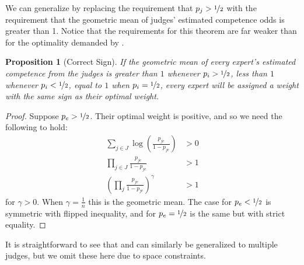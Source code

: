 \documentclass[letterpaper]{article} %
\newtheorem{proposition}{Proposition}
\newcommand{\judge}{\ensuremath{j} }
\newcommand{\judges}{\ensuremath{J} }
\newcommand{\expert}{\ensuremath{e} }
\newcommand{\ben}[1]{\textcolor{red}{Ben says: #1}}
\begin{document}
We can generalize  by replacing the requirement that $p_j > \nicefrac{1}{2}$ with the requirement that the geometric mean of judges' estimated competence odds is greater than 1. Notice that the requirements for this theorem are far weaker than for the optimality demanded by .


\begin{proposition}[Correct Sign]\label{theorem:rightsign}
If the geometric mean of every expert's estimated competence from the judges is greater than $1$ whenever $p_i > \nicefrac{1}{2}$, less than $1$ whenever $p_i < \nicefrac{1}{2}$, equal to $1$ when $p_i = \nicefrac{1}{2}$, every expert will be assigned a weight with the same sign as their optimal weight.
\end{proposition}

\begin{proof}
%
Suppose $p_\expert > \nicefrac{1}{2}$. Their optimal weight is positive, and so we need the following to hold:
\scriptsize
\begin{align*}
 \sum\limits_{\judge \in \judges} \log\left(\frac{p_{\judge\expert}}{1-p_{\judge\expert}}\right) & > 0\\
\prod\limits_{\judge \in \judges} \frac{p_{\judge\expert}}{1-p_{\judge\expert}} & > 1 \\
\left(\prod\limits_\judge \frac{p_{\judge\expert}}{1-p_{\judge\expert}} \right)^\gamma & > 1
\end{align*}
\normalsize
for $\gamma > 0$. When $\gamma = \frac{1}{n}$ this is the geometric mean.
%
The case for $p_\expert < \nicefrac{1}{2}$ is symmetric with flipped inequality, and for $p_\expert = \nicefrac{1}{2}$ is the same but with strict equality.
\end{proof}

It is straightforward to see that  and  can similarly be generalized to multiple judges, but we omit these here due to space constraints.



\end{document}
